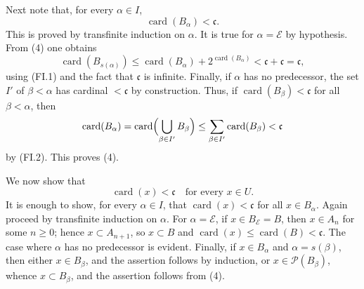 \documentclass[11pt]{article}
\newcommand{\card}{\operatorname{card}}
\newcommand{\Pset}{\mathcal{P}}
\begin{document}
Next note that, for every \(\alpha\in I\),
\begin{equation}
 \card(B_\alpha)<\mathfrak c.
 \tag{4}
\end{equation}
This is proved by transfinite induction on \(\alpha\). It is true for \(\alpha=\mathcal E\) by hypothesis. From (4) one obtains
\[
 \card(B_{s(\alpha)})\leq \card(B_\alpha)+2^{\card(B_\alpha)}<\mathfrak c+\mathfrak c=\mathfrak c,
\]
using (FI.1) and the fact that \(\mathfrak c\) is infinite. Finally, if \(\alpha\) has no predecessor, the set \(I'\) of \(\beta<\alpha\) has cardinal \(<\mathfrak c\) by construction. Thus, if \(\card(B_\beta)<\mathfrak c\) for all \(\beta<\alpha\), then
\[
 \card(B_\alpha)=\card\Bigl(\bigcup_{\beta\in I'}B_\beta\Bigr)
 \leq \sum_{\beta\in I'}\card(B_\beta)<\mathfrak c
\]
by (FI.2). This proves (4).

We now show that
\begin{equation}
 \card(x)<\mathfrak c\quad\text{for every }x\in U.
 \tag{5}
\end{equation}
It is enough to show, for every \(\alpha\in I\), that \(\card(x)<\mathfrak c\) for all \(x\in B_\alpha\). Again proceed by transfinite induction on \(\alpha\). For \(\alpha=\mathcal E\), if \(x\in B_{\mathcal E}=B\), then \(x\in A_n\) for some \(n\geq0\); hence \(x\subset A_{n+1}\), so \(x\subset B\) and \(\card(x)\leq\card(B)<\mathfrak c\). The case where \(\alpha\) has no predecessor is evident. Finally, if \(x\in B_\alpha\) and \(\alpha=s(\beta)\), then either \(x\in B_\beta\), and the assertion follows by induction, or \(x\in\Pset(B_\beta)\), whence \(x\subset B_\beta\), and the assertion follows from (4).
\end{document}
